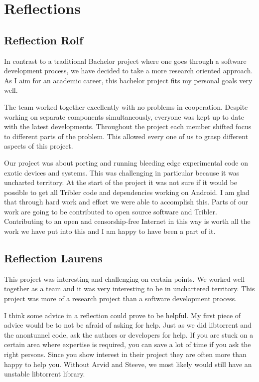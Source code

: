	\section{Reflections}
	
		\subsection{Reflection Rolf}
			In contrast to a traditional Bachelor project where one goes through a software development process, we have decided to take a more research oriented approach. As I aim for an academic career, this bachelor project fits my personal goals very well.
		
			The team worked together excellently with no problems in cooperation. Despite working on separate components simultaneously, everyone was kept up to date with the latest developments. Throughout the project each member shifted focus to different parts of the problem. This allowed every one of us to grasp different aspects of this project.
		
			Our project was about porting and running bleeding edge experimental code on exotic devices and systems. This was challenging in particular because it was uncharted territory. At the start of the project it was not sure if it would be possible to get all Tribler code and dependencies working on Android. I am glad that through hard work and effort we were able to accomplish this. Parts of our work are going to be contributed to open source software and Tribler. Contributing to an open and censorship-free Internet in this way is worth all the work we have put into this and I am happy to have been a part of it.
		
		\subsection{Reflection Laurens}
			This project was interesting and challenging on certain points. We worked well together as a team and it was very interesting to be in unchartered territory. This project was more of a research project than a software development process.
			
			I think some advice in a reflection could prove to be helpful. My first piece of advice would be to not be afraid of asking for help.
			Just as we did libtorrent and the anontunnel code, ask the authors or developers for help. If you are stuck on a certain area where expertise is required, you can save a lot of time if you ask the right persons.
			Since you show interest in their project they are often more than happy to help you. Without Arvid and Steeve, we most likely would still have an unstable libtorrent library.
			
